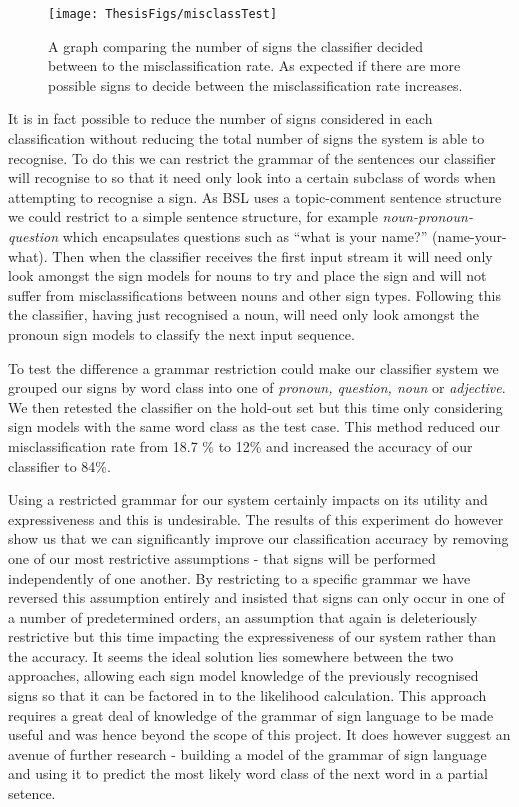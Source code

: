 \begin{figure}[t]
        \centering
        \texttt{[image: ThesisFigs/misclassTest]}
        \caption{A graph comparing the number of signs the classifier decided between to the misclassification rate. As expected if there are more possible signs to decide between the misclassification rate increases.}\label{fig:misclassTest}
\end{figure}

It is in fact possible to reduce the number of signs considered in each classification without reducing the total number of signs the system is able to recognise. To do this we can restrict the grammar of the sentences our classifier will recognise to so that it need only look into a certain subclass of words when attempting to recognise a sign. As BSL uses a topic-comment sentence structure we could restrict to a simple sentence structure, for example \emph{noun-pronoun-question} which encapsulates questions such as ``what is your name?'' (name-your-what). Then when the classifier receives the first input stream it will need only look amongst the sign models for nouns to try and place the sign and will not suffer from misclassifications between nouns and other sign types. Following this the classifier, having just recognised a noun, will need only look amongst the pronoun sign models to classify the next input sequence. 

To test the difference a grammar restriction could make our classifier system we grouped our signs by word class into one of \emph{pronoun, question, noun} or \emph{adjective}. We then retested the classifier on the hold-out set but this time only considering sign models with the same word class as the test case. This method reduced our misclassification rate from 18.7 \% to 12\% and increased the accuracy of our classifier to 84\%.

Using a restricted grammar for our system certainly impacts on its utility and expressiveness and this is undesirable. The results of this experiment do however show us that we can significantly improve our classification accuracy by removing one of our most restrictive assumptions - that signs will be performed independently of one another. By restricting to a specific grammar we have reversed this assumption entirely and insisted that signs can only occur in one of a number of predetermined orders, an assumption that again is deleteriously restrictive but this time impacting the expressiveness of our system rather than the accuracy. It seems the ideal solution lies somewhere between the two approaches, allowing each sign model knowledge of the previously recognised signs so that it can be factored in to the likelihood calculation. This approach requires a great deal of knowledge of the grammar of sign language to be made useful and was hence beyond the scope of this project. It does however suggest an avenue of further research - building a model of the grammar of sign language and using it to predict the most likely word class of the next word in a partial setence.

